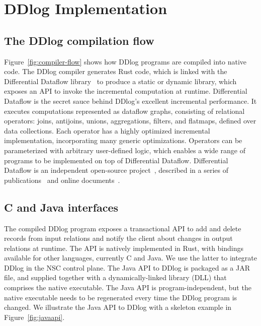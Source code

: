 \section{DDlog Implementation}\label{sec-system}

\subsection{The DDlog compilation flow}

Figure~\ref{fig:compiler-flow} shows how DDlog programs are compiled
into native code.  The DDlog compiler generates Rust code, which is
linked with the Differential Dataflow
library~\cite{differential-dataflow} to produce a static or dynamic
library, which exposes an API to invoke the incremental computation at
runtime.  Differential Dataflow is the secret sauce behind DDlog's
excellent incremental performance.  It executes computations
represented as dataflow graphs, consisting of relational operators:
joins, antijoins, unions, aggregations, filters, and flatmaps, defined
over data collections.  Each operator has a highly optimized
incremental implementation, incorporating many generic optimizations.
Operators can be parameterized with arbitrary user-defined logic,
which enables a wide range of programs to be implemented on top of
Differential Dataflow.  Differential Dataflow is an independent
open-source project~\cite{differential-dataflow}, described in a
series of
publications~\cite{timely-dataflow,differential-dataflow-paper} and
online documents~\cite{dd-mdbook,dd-reference}.

\subsection{C and Java interfaces}

The compiled DDlog program exposes a transactional API to add and
delete records from input relations and notify the client about
changes in output relations at runtime.  The API is natively
implemented in Rust, with bindings available for other languages,
currently C and Java.  We use the latter to integrate DDlog in the NSC
control plane.  The Java API to DDlog is packaged as a JAR file, and
supplied together with a dynamically-linked library (DLL) that
comprises the native executable.  The Java API is program-independent,
but the native executable needs to be regenerated every time the DDlog
program is changed. We illustrate the Java API to DDlog with a
skeleton example in Figure~\ref{fig:javaapi}.


